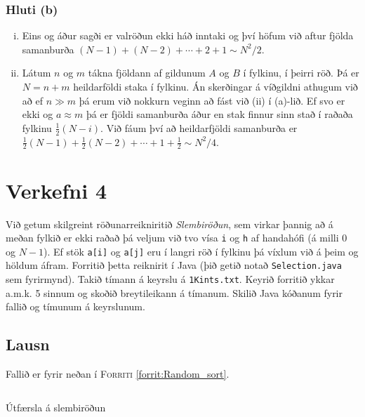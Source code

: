 \documentclass[12pt, a4paper, hidelinks]{article}
\begin{document}
\subsubsection*{Hluti (b)}
    \begin{enumerate}[(i)]
       \item Eins og áður sagði er valröðun ekki háð inntaki og því höfum við aftur fjölda samanburða $(N - 1) + (N - 2) + \cdots + 2 + 1 \sim N^2/2$.
       \item Látum $n$ og $m$ tákna fjöldann af gildunum $A$ og $B$ í fylkinu, í þeirri röð. Þá er $N = n + m$ heildarföldi staka í fylkinu. Án skerðingar á
       víðgildni athugum við að ef $n \gg m$ þá erum við nokkurn veginn að fást við (ii) í (a)-lið. Ef svo er ekki og $a \approx m$ þá er fjöldi samanburða áður
       en stak finnur sinn stað í raðaða fylkinu $\frac 12 (N - i)$. Við fáum því að heildarfjöldi samanburða er $\frac 12 (N - 1) + \frac 12 (N - 2) + \cdots + 1 + \frac 12 \sim N^2/4$.
    \end{enumerate}

\newpage

\section*{Verkefni 4}
Við getum skilgreint röðunarreikniritið \emph{Slembiröðun}, sem virkar þannig að á meðan fylkið
er ekki raðað þá veljum við tvo vísa \texttt{i} og \texttt{h} af handahófi (á milli $0$ og $N - 1$). Ef
stök \texttt{a[i]} og \texttt{a[j]} eru í langri röð í fylkinu þá víxlum við á þeim og höldum áfram. Forritið
þetta reiknirit í Java (þið getið notað \texttt{Selection.java} sem fyrirmynd). Takið tímann á keyrslu á \texttt{1Kints.txt}.
Keyrið forritið ykkar a.m.k. 5 sinnum og skoðið breytileikann á tímanum. Skilið Java kóðanum fyrir fallið og tímunum á keyrslunum.

\subsection*{Lausn}

Fallið er fyrir neðan í \textsc{Forriti} \ref{forrit:Random_sort}.

\begin{listing}[H]
    \centering
    \inputminted[linenos, frame=single, fontsize=\footnotesize, firstline=34, lastline=43]{java}{../src/V5/Random.java}
    \caption{Útfærsla á slembiröðun}
    \label{forrit:Random_sort}
\end{listing}
\end{document}

